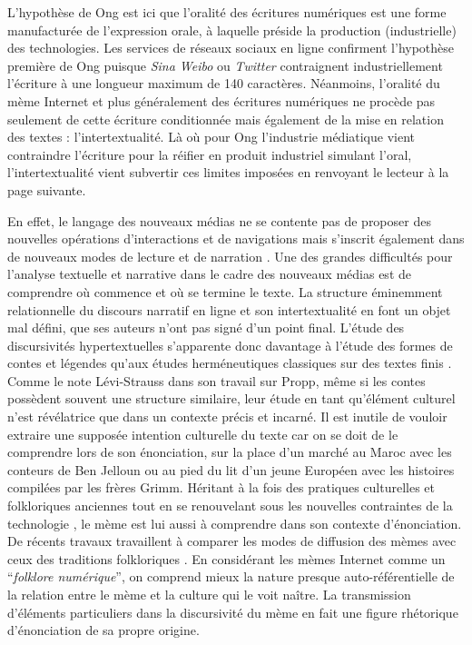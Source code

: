 L{\textquoteright}hypothèse de Ong est ici que l{\textquoteright}oralité des écritures numériques est une forme manufacturée de l{\textquoteright}expression orale, à laquelle préside la production (industrielle) des technologies. Les services de réseaux sociaux en ligne confirment l{\textquoteright}hypothèse première de Ong puisque \textit{Sina Weibo }ou \textit{Twitter} contraignent industriellement l{\textquoteright}écriture à une longueur maximum de 140 caractères. Néanmoins, l{\textquoteright}oralité du mème Internet et plus généralement des écritures numériques ne procède pas seulement de cette écriture conditionnée mais également de la mise en relation des textes : l{\textquoteright}intertextualité. Là o\`u pour Ong l{\textquoteright}industrie médiatique vient contraindre l{\textquoteright}écriture pour la réifier en produit industriel simulant l{\textquoteright}oral, l{\textquoteright}intertextualité vient subvertir ces limites imposées en renvoyant le lecteur à la page suivante.  

En effet, le langage des nouveaux médias ne se contente pas de proposer des nouvelles opérations d{\textquoteright}interactions et de navigations mais s{\textquoteright}inscrit également dans de nouveaux modes de lecture et de narration \citep{Manovich2001}. Une des grandes difficultés pour l{\textquoteright}analyse textuelle et narrative dans le cadre des nouveaux médias est de comprendre o\`u commence et o\`u se termine le texte. La structure éminemment relationnelle du discours narratif en ligne et son intertextualité en font un objet mal défini, que ses auteurs n{\textquoteright}ont pas signé d{\textquoteright}un point final. L{\textquoteright}étude des discursivités hypertextuelles s{\textquoteright}apparente donc davantage à l{\textquoteright}étude des formes de contes et légendes qu{\textquoteright}aux études herméneutiques classiques sur des textes finis \citep{Clement1995}. Comme le note Lévi-Strauss dans son travail sur Propp, même si les contes possèdent souvent une structure similaire, leur étude en tant qu{\textquoteright}élément culturel n{\textquoteright}est révélatrice que dans un contexte précis et incarné. Il est inutile de vouloir extraire une supposée intention culturelle du texte car on se doit de le comprendre lors de son énonciation, sur la place d{\textquoteright}un marché au Maroc avec les conteurs de Ben Jelloun ou au pied du lit d{\textquoteright}un jeune Européen avec les histoires compilées par les frères Grimm. Héritant à la fois des pratiques culturelles et folkloriques anciennes tout en se renouvelant sous les nouvelles contraintes de la technologie \citep{Barber2008}, le mème est lui aussi à comprendre dans son contexte d{\textquoteright}énonciation. De récents travaux travaillent à comparer les modes de diffusion des mèmes avec ceux des traditions folkloriques \citep{Seta2014}. En considérant les mèmes Internet comme un {\textquotedblleft}\textit{folklore numérique}{\textquotedblright}, on comprend mieux la nature presque auto-référentielle de la relation entre le mème et la culture qui le voit na\^itre. La transmission d{\textquoteright}éléments particuliers dans la discursivité du mème en fait une figure rhétorique d{\textquoteright}énonciation de sa propre origine. 

